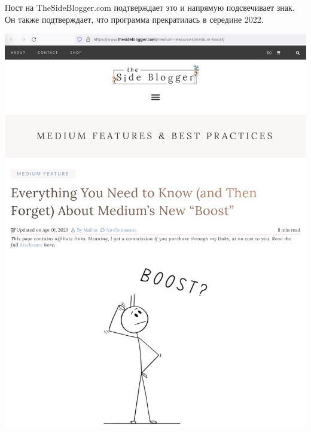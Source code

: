 Пост на TheSideBlogger.com подтверждает это и напрямую подсвечивает знак.
Он также подтверждает, что программа прекратилась в середине 2022.

\begin{center}
    \includegraphics[width=38em]{thesideblogger-p1}
\end{center}
\WillContinue
\pagebreak

